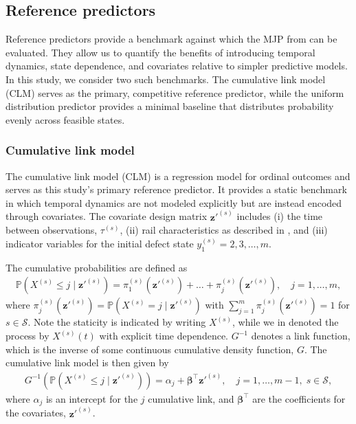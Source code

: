\subsection{Reference predictors} \label{sec:reference_forecasts}
Reference predictors provide a benchmark against which the MJP from  can be evaluated. They allow us to quantify the benefits of introducing temporal dynamics, state dependence, and covariates relative to simpler predictive models.
In this study, we consider two such benchmarks. The cumulative link model (CLM) serves as the primary, competitive reference predictor, while the uniform distribution predictor provides a minimal baseline that distributes probability evenly across feasible states.

\subsubsection{Cumulative link model} \label{sec:cumulative_link_model}

The cumulative link model (CLM) is a regression model for ordinal outcomes and serves as this study's primary reference predictor. It provides a static benchmark in which temporal dynamics are not modeled explicitly but are instead encoded through covariates. The covariate design matrix $\bm{z}'^{(s)}$ includes (i) the time between observations, $\tau^{(s)}$, (ii) rail characteristics as described in , and (iii) indicator variables for the initial defect state $y_1^{(s)} =2,3,\dots,m$. 

The cumulative probabilities are defined as
\begin{align*}
     \mathds{P}\left( X^{(s)} \leq j \; \vert \; \bm{z}'^{(s)} \right) = 
     \pi_1^{(s)}(\bm{z}'^{(s)}) + \dots + \pi_j^{(s)}(\bm{z}'^{(s)}), \quad j = 1, \dots, m, 
\end{align*}
where $\pi^{(s)}_j\left(\bm{z}'^{(s)}\right) = \mathds{P} \left(  X^{(s)} = j \; \vert \; \bm{z}'^{(s)} \right)$ with $\sum_{j = 1}^m \pi^{(s)}_j(\bm{z}'^{(s)}) = 1$ for $s \in \mathcal{S}$. 
Note the staticity is indicated by writing $X^{(s)}$, while we in  denoted the process by $X^{(s)}(t)$ with explicit time dependence.
$G^{-1}$ denotes a link function, which is the inverse of some continuous cumulative density function, $G$.
The cumulative link model is then given by
\begin{align}
    G^{-1} \left(  \mathds{P}\left( X^{(s)} \leq j \; \vert \; \bm{z}'^{(s)} \right) \right)
    = \alpha_j + \bm{\beta}^\top \bm{z}'^{(s)}, \quad j = 1, \dots, m-1, \; s \in \mathcal{S}, \label{eq:cum_link_model}
\end{align}
where $\alpha_j$ is an intercept for the $j$ cumulative link, and $\bm{\beta}^\top$ are the coefficients for the covariates, $\bm{z}'^{(s)}$. 

